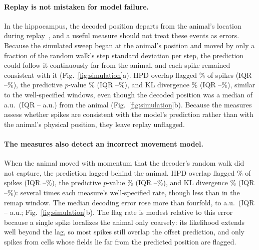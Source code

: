 \documentclass[12pt]{article}
\begin{document}
\paragraph{Replay is not mistaken for model failure.} In the hippocampus, the decoded position departs from the animal's location during replay~\cite{EdenCharacterizingComplexMultiScale2018}, and a useful measure should not treat these events as errors. Because the simulated sweep began at the animal's position and moved by only a fraction of the random walk's step standard deviation per step, the prediction could follow it continuously far from the animal, and each spike remained consistent with it (Fig.~\ref{fig:simulation}a). HPD overlap flagged \SimFlagReplayHpd\% of spikes (IQR \SimFlagReplayHpdQuartileLow--\SimFlagReplayHpdQuartileHigh\%), the predictive $p$-value \SimFlagReplayPvalue\% (IQR \SimFlagReplayPvalueQuartileLow--\SimFlagReplayPvalueQuartileHigh\%), and KL divergence \SimFlagReplayKl\% (IQR \SimFlagReplayKlQuartileLow--\SimFlagReplayKlQuartileHigh\%), similar to the well-specified windows, even though the decoded position was a median of \SimReplayError{} a.u.\ (IQR \SimReplayErrorQuartileLow--\SimReplayErrorQuartileHigh{} a.u.) from the animal (Fig.~\ref{fig:simulation}b). Because the measures assess whether spikes are consistent with the model's prediction rather than with the animal's physical position, they leave replay unflagged.

\paragraph{The measures also detect an incorrect movement model.} When the animal moved with momentum that the decoder's random walk did not capture, the prediction lagged behind the animal. HPD overlap flagged \SimFlagMomentumHpd\% of spikes (IQR \SimFlagMomentumHpdQuartileLow--\SimFlagMomentumHpdQuartileHigh\%), the predictive $p$-value \SimFlagMomentumPvalue\% (IQR \SimFlagMomentumPvalueQuartileLow--\SimFlagMomentumPvalueQuartileHigh\%), and KL divergence \SimFlagMomentumKl\% (IQR \SimFlagMomentumKlQuartileLow--\SimFlagMomentumKlQuartileHigh\%): several times each measure's well-specified rate, though less than in the remap window. The median decoding error rose more than fourfold, to \SimMomentumError{} a.u.\ (IQR \SimMomentumErrorQuartileLow--\SimMomentumErrorQuartileHigh{} a.u.; Fig.~\ref{fig:simulation}b). The flag rate is modest relative to this error because a single spike localizes the animal only coarsely: its likelihood extends well beyond the lag, so most spikes still overlap the offset prediction, and only spikes from cells whose fields lie far from the predicted position are flagged.
\end{document}
